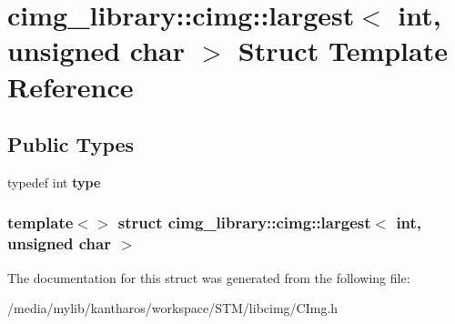 \hypertarget{structcimg__library_1_1cimg_1_1largest_3_01int_00_01unsigned_01char_01_4}{
\section{cimg\_\-library::cimg::largest$<$ int, unsigned char $>$ Struct Template Reference}
\label{structcimg__library_1_1cimg_1_1largest_3_01int_00_01unsigned_01char_01_4}
}
\subsection*{Public Types}
\begin{DoxyCompactItemize}
\item 
\hypertarget{structcimg__library_1_1cimg_1_1largest_3_01int_00_01unsigned_01char_01_4_a4c682314f7a4a228c4ea8f7237f89801}{
typedef int {\bfseries type}}
\label{structcimg__library_1_1cimg_1_1largest_3_01int_00_01unsigned_01char_01_4_a4c682314f7a4a228c4ea8f7237f89801}

\end{DoxyCompactItemize}
\subsubsection*{template$<$$>$ struct cimg\_\-library::cimg::largest$<$ int, unsigned char $>$}



The documentation for this struct was generated from the following file:\begin{DoxyCompactItemize}
\item 
/media/mylib/kantharos/workspace/STM/libcimg/CImg.h\end{DoxyCompactItemize}
